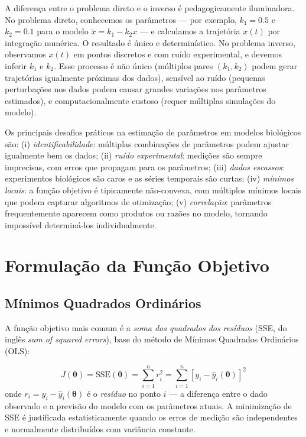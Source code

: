 A diferença entre o problema direto e o inverso é pedagogicamente iluminadora. No problema
direto, conhecemos os parâmetros --- por exemplo, $k_1 = 0.5$ e $k_2 = 0.1$ para o modelo
$\dot{x} = k_1 - k_2 x$ --- e calculamos a trajetória $x(t)$ por integração numérica. O
resultado é único e determinístico. No problema inverso, observamos $x(t)$ em pontos
discretos e com ruído experimental, e devemos inferir $k_1$ e $k_2$. Esse processo é não
único (múltiplos pares $(k_1, k_2)$ podem gerar trajetórias igualmente próximas dos dados),
sensível ao ruído (pequenas perturbações nos dados podem causar grandes variações nos
parâmetros estimados), e computacionalmente custoso (requer múltiplas simulações do modelo).

Os principais desafios práticos na estimação de parâmetros em modelos biológicos são:
(i) \emph{identificabilidade}: múltiplas combinações de parâmetros podem ajustar igualmente
bem os dados; (ii) \emph{ruído experimental}: medições são sempre imprecisas, com erros que
propagam para os parâmetros; (iii) \emph{dados escassos}: experimentos biológicos são caros
e as séries temporais são curtas; (iv) \emph{mínimos locais}: a função objetivo é
tipicamente não-convexa, com múltiplos mínimos locais que podem capturar algoritmos de
otimização; (v) \emph{correlação}: parâmetros frequentemente aparecem como produtos ou
razões no modelo, tornando impossível determiná-los individualmente.

\section{Formulação da Função Objetivo}

\subsection{Mínimos Quadrados Ordinários}

A função objetivo mais comum é a \emph{soma dos quadrados dos resíduos} (SSE, do inglês
\textit{sum of squared errors}), base do método de Mínimos Quadrados Ordinários (OLS):

\begin{equation}
J(\boldsymbol{\theta}) = \text{SSE}(\boldsymbol{\theta}) = \sum_{i=1}^{n} r_i^2 =
\sum_{i=1}^{n} \left[y_i - \hat{y}_i(\boldsymbol{\theta})\right]^2
\end{equation}
onde $r_i = y_i - \hat{y}_i(\boldsymbol{\theta})$ é o \emph{resíduo} no ponto $i$ ---
a diferença entre o dado observado e a previsão do modelo com os parâmetros atuais.
A minimização de SSE é justificada estatisticamente quando os erros de medição são
independentes e normalmente distribuídos com variância constante.

